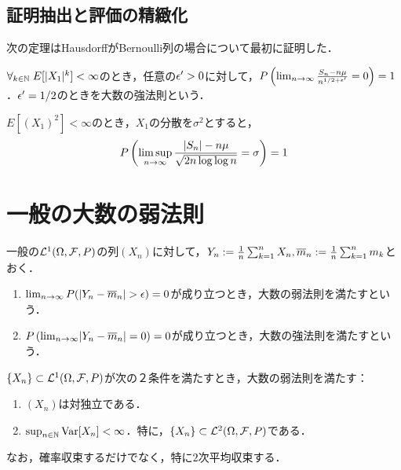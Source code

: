 \documentclass[uplatex,dvipdfmx]{jsreport}
\begin{document}
\subsection{証明抽出と評価の精緻化}

\begin{tcolorbox}[colframe=ForestGreen, colback=ForestGreen!10!white,breakable,colbacktitle=ForestGreen!40!white,coltitle=black,fonttitle=\bfseries\sffamily,
title=]
    次の定理はHausdorffがBernoulli列の場合について最初に証明した．
\end{tcolorbox}

\begin{theorem}
    $\forall_{k\in\mathbb{N}}\;E[\lvert X_1\rvert^k]<\infty$のとき，任意の$\epsilon'>0$に対して，$P\left(\lim_{n\to\infty}\frac{S_n-n\mu}{n^{1/2+\epsilon'}}=0\right)=1$．$\epsilon'=1/2$のときを大数の強法則という．
\end{theorem}

\begin{theorem}
    $E[(X_1)^2]<\infty$のとき，$X_1$の分散を$\sigma^2$とすると，
    \[P\left(\limsup_{n\to\infty}\frac{\lvert S_n\rvert-n\mu}{\sqrt{2n\log\log n}}=\sigma\right)=1\]
\end{theorem}

\section{一般の大数の弱法則}

\begin{definition}
    一般の$\mathcal{L}^1(\Omega,\mathcal{F},P)$の列$(X_n)$に対して，$Y_n:=\frac{1}{n}\sum_{k=1}^nX_n,\overline{m}_n:=\frac{1}{n}\sum_{k=1}^nm_k$とおく．
    \begin{enumerate}
        \item $\lim_{n\to\infty}P(\lvert Y_n-\overline{m}_n\rvert>\epsilon)=0$が成り立つとき，大数の弱法則を満たすという．
        \item $P\left(\lim_{n\to\infty}\lvert Y_n-\overline{m}_n\rvert=0\right)=0$が成り立つとき，大数の強法則を満たすという．
    \end{enumerate}
\end{definition}

\begin{theorem}
    $\{X_n\}\subset\mathcal{L}^1(\Omega,\mathcal{F},P)$が次の２条件を満たすとき，大数の弱法則を満たす：
    \begin{enumerate}
        \item $(X_n)$は対独立である．
        \item $\sup_{n\in\mathbb{N}}\mathrm{Var}[X_n]<\infty$．特に，$\{X_n\}\subset\mathcal{L}^2(\Omega,\mathcal{F},P)$である．
    \end{enumerate}
    なお，確率収束するだけでなく，特に$2$次平均収束する．
\end{theorem}
\end{document}
